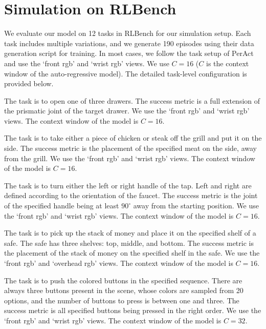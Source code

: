 \section{Simulation on RLBench}
\label{supp:sim_on_rlbench}
We evaluate our model on 12 tasks in RLBench for our simulation setup. Each task includes multiple variations, and we generate 190 episodes using their data generation script for \smodel{} training. In most cases, we follow the task setup of PerAct~\cite{shridhar2023perceiver} and use the `front rgb' and `wrist rgb' views. We use $C= 16$ ($C$ is the context window  of the auto-regressive model). The detailed task-level configuration is provided below.

 The task is to open one of three drawers. The success metric is a full extension of the prismatic joint of the target drawer. We use the `front rgb' and `wrist rgb' views. The context window  of the model is $C = 16$.

 The task is to take either a piece of chicken or steak off the grill and put it on the side. The success metric is the placement of the specified meat on the side, away from the grill. We use the `front rgb' and `wrist rgb' views. The context window  of the model is $C = 16$.

 The task is to turn either the left or right handle of the tap. Left and right are defined according to the orientation of the faucet. The success metric is the joint of the specified handle being at least $90^\circ$ away from the starting position. We use the `front rgb' and `wrist rgb' views. The context window  of the model is $C = 16$.

 The task is to pick up the stack of money and place it on the specified shelf of a safe. The safe has three shelves: top, middle, and bottom. The success metric is the placement of the stack of money on the specified shelf in the safe. We use the `front rgb' and `overhead rgb' views. The context window  of the model is $C = 16$.

 The task is to push the colored buttons in the specified sequence. There are always three buttons present in the scene, whose colors are sampled from 20 options, and the number of buttons to press is between one and three. The success metric is all specified buttons being pressed in the right order. We use the `front rgb' and `wrist rgb' views. The context window  of the model is $C = 32$.

